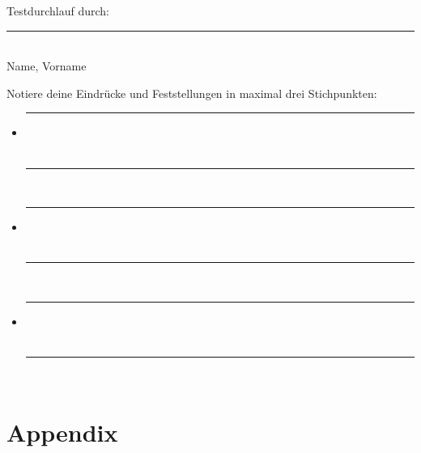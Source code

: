 \documentclass[10pt, fleqn]{scrartcl}
\begin{document}
Testdurchlauf durch:
\noindent\null
\rule{11.5cm}{.4pt} \\

\noindent\hspace*{7cm}
Name, Vorname \\
\vspace{1cm}

\noindent\null
Notiere deine Eindrücke und Feststellungen in maximal drei Stichpunkten:

\begin{itemize}
	\item \noindent\null\rule{14cm}{.4pt} \\
		  \vspace{0.1cm} \\
		  \noindent\null\rule{14cm}{.4pt} \\
	\item \noindent\null\rule{14cm}{.4pt} \\
		  \vspace{0.1cm} \\
		  \noindent\null\rule{14cm}{.4pt} \\
	\item \noindent\null\rule{14cm}{.4pt} \\
		  \vspace{0.1cm} \\
		  \noindent\null\rule{14cm}{.4pt} \\
\end{itemize}


\newpage

\printbibliography


\newpage

\appendix

\section{Appendix}
\end{document}
